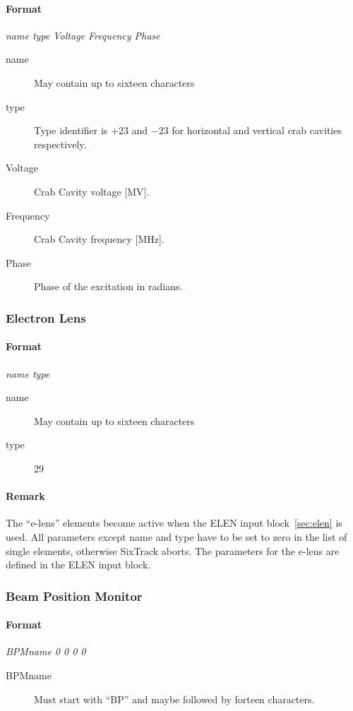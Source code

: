 \documentclass[a4paper,11pt]{report}
\begin{document}
\paragraph{Format} {\em name type Voltage Frequency Phase}
\begin{description}
\item [name] May contain up to sixteen characters
\item [type] Type identifier is $+23$ and $-23$ for horizontal and vertical
  crab cavities respectively.
\item [Voltage] Crab Cavity voltage [MV].
\item [Frequency] Crab Cavity frequency [MHz]. 
\item [Phase] Phase of the excitation in radians.
\end{description}


\subsubsection{Electron Lens} \label{ELEN}
\paragraph{Format} {\em name type}
\begin{description}
	\item [name] May contain up to sixteen characters
	\item [type] 29
\end{description}

\paragraph{Remark}
The ``e-lens'' elements become active when the
ELEN input block~\ref{sec:elen} is used. All parameters except name and type have to be set to zero in the list of single elements, otherwise SixTrack aborts. The parameters for the e-lens are defined in the ELEN input block.

\subsubsection{Beam Position Monitor} \label{BPM}
\paragraph{Format} {\em BPMname 0 0 0 0}
\begin{description}
\item [BPMname] Must start with ``BP'' and maybe followed by forteen characters.
\end{description}
\end{document}
